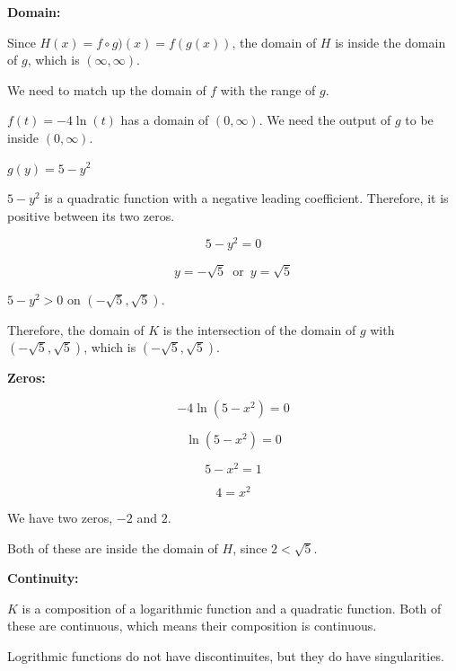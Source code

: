 \documentclass{ximera}
\begin{document}
\textbf{\textcolor{blue!55!black}{Domain:}} 



Since $H(x) = f \circ g)(x) = f(g(x))$, the domain of $H$ is inside the domain of $g$, which is $(\infty, \infty)$. 

We need to match up the domain of $f$ with the range of $g$. 


$f(t) = -4 \ln(t)$ has a domain of $(0, \infty)$.  We need the output of $g$ to be inside $(0, \infty)$. 



$g(y) = 5 - y^2$ 



$5 - y^2$ is a quadratic function with a negative leading coefficient.  Therefore, it is positive between its two zeros.


\[
5 - y^2 = 0
\]

\[
y = -\sqrt{5}  \,  \text{ or } \, y = \sqrt{5} 
\]




$5 - y^2 > 0$ on $(-\sqrt{5}, \sqrt{5})$. 




Therefore, the domain of $K$ is the intersection of the domain of $g$ with $(-\sqrt{5}, \sqrt{5})$, which is $(-\sqrt{5}, \sqrt{5})$. 



\textbf{\textcolor{blue!55!black}{Zeros:}} 




\[
-4 \ln(5 - x^2) = 0
\]


\[
 \ln(5 - x^2) = 0
\]


\[
5 - x^2 = 1
\]


\[
4 = x^2
\]


We have two zeros, $-2$ and $2$. 

Both of these are inside the domain of $H$, since $2 < \sqrt{5}$. 













\textbf{\textcolor{blue!55!black}{Continuity:}} 


$K$ is a composition of a logarithmic function and a quadratic function.  Both of these are continuous, which means their composition is continuous. 

Logrithmic functions do not have discontinuites, but they do have singularities.  
\end{document}
